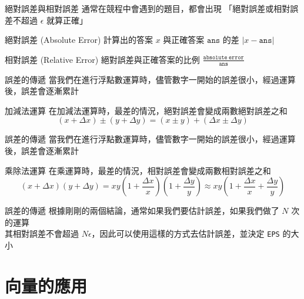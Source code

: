\documentclass[aspectratio=169]{beamer}
\begin{document}
\begin{frame}[fragile]{絕對誤差與相對誤差}
    通常在競程中會遇到的題目，都會出現 「絕對誤差或相對誤差不超過 $\epsilon$ 就算正確」
    \begin{alertblock}{絕對誤差 (Absolute Error)}
        計算出的答案 $x$ 與正確答案 $\mathtt{ans}$ 的差 $|x - \mathtt{ans}|$
    \end{alertblock}
    
    \begin{alertblock}{相對誤差 (Relative Error)}
        絕對誤差與正確答案的比例 $\frac{\mathtt{absolute} \ \mathtt{error}}{\mathtt{ans}}$
    \end{alertblock}
\end{frame}

\begin{frame}[fragile]{誤差的傳遞}
    當我們在進行浮點數運算時，儘管數字一開始的誤差很小，經過運算後，誤差會逐漸累計
    \begin{alertblock}{加減法運算}
        在加減法運算時，最差的情況，絕對誤差會變成兩數絕對誤差之和
        $$(x+\Delta x) \pm (y + \Delta y) = (x \pm y) + (\Delta x \pm \Delta y)$$
    \end{alertblock}
\end{frame}

\begin{frame}[fragile]{誤差的傳遞}
    當我們在進行浮點數運算時，儘管數字一開始的誤差很小，經過運算後，誤差會逐漸累計
    \begin{alertblock}{乘除法運算}
        在乘運算時，最差的情況，相對誤差會變成兩數相對誤差之和
        $$(x+\Delta x)(y + \Delta y) = xy(1 + \frac{\Delta x}{x})(1 + \frac{\Delta y}{y}) \approx xy(1+ \frac{\Delta x}{x} + \frac{\Delta y}{y})$$
    \end{alertblock}
\end{frame}

\begin{frame}[fragile]{誤差的傳遞}
    根據剛剛的兩個結論，通常如果我們要估計誤差，如果我們做了 $N$ 次的運算 \\
    \vspace{2.5mm}
    其相對誤差不會超過 $N \epsilon$，因此可以使用這樣的方式去估計誤差，並決定 \texttt{EPS} 的大小
\end{frame}

\section{向量的應用}
\end{document}
